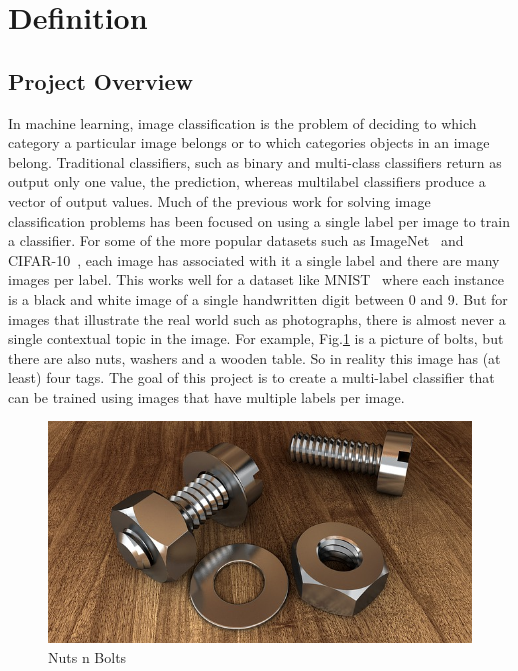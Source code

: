 \documentclass[12pt,journal,compsoc]{IEEEtran}
\begin{document}
\section{Definition} %
\subsection{Project Overview}



In machine learning, image classification is the problem of deciding to which category a particular image belongs or to which categories objects in an image belong. Traditional classifiers, such as binary and multi-class classifiers return as output only one value, the prediction, whereas multilabel classifiers produce a vector of output values. Much of the previous work for solving image classification problems has been focused on using a single label per image to train a classifier.  For some of the more popular datasets such as ImageNet~\cite{ILSVRC15} and CIFAR-10~\cite{Krizhevsky2009}, each image has associated with it a single label and there are many images per label. This works well for a dataset like MNIST~\cite{mnist} where each instance is a black and white image of a single handwritten digit between 0 and 9.  But for images that illustrate the real world such as photographs, there is almost never a single contextual topic in the image. For example, Fig.\ref{screw-1924174_640} is a picture of bolts, but there are also nuts, washers and a wooden table.  So in reality this image has (at least) four tags.  The goal of this project is to create a multi-label classifier that can be trained using images that have multiple labels per image.

\begin{figure}
	\includegraphics[width=\linewidth]{screw-1924174_640.jpg} %
	\caption{Nuts n Bolts} %
	\label{screw-1924174_640} %
\end{figure}
\end{document}
